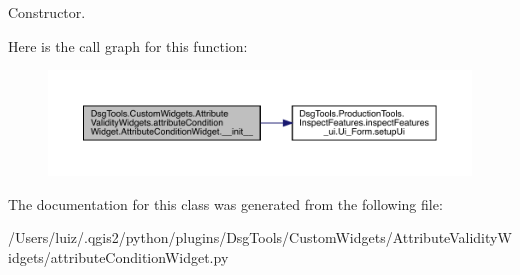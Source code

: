 \begin{DoxyVerb}Constructor.\end{DoxyVerb}
 Here is the call graph for this function\+:
\nopagebreak
\begin{figure}[H]
\begin{center}
\leavevmode
\includegraphics[width=350pt]{class_dsg_tools_1_1_custom_widgets_1_1_attribute_validity_widgets_1_1attribute_condition_widget_1_1_attribute_condition_widget_a75d3356e60dbb857c2a3c3882c020651_cgraph}
\end{center}
\end{figure}


The documentation for this class was generated from the following file\+:\begin{DoxyCompactItemize}
\item 
/\+Users/luiz/.\+qgis2/python/plugins/\+Dsg\+Tools/\+Custom\+Widgets/\+Attribute\+Validity\+Widgets/attribute\+Condition\+Widget.\+py\end{DoxyCompactItemize}
